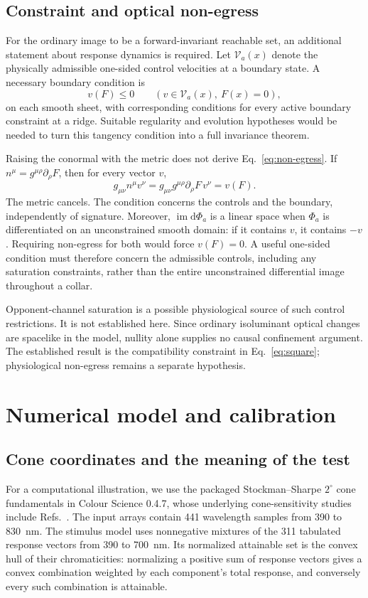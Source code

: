 \documentclass[11pt,letterpaper]{article}
\theoremstyle{plain}
\newcommand{\dd}{\mathrm{d}}
\begin{document}
\subsection{Constraint and optical non-egress}
For the ordinary image to be a forward-invariant reachable set, an additional statement about response dynamics is required. Let $\mathcal V_a(x)$ denote the physically admissible one-sided control velocities at a boundary state. A necessary boundary condition is
\begin{equation}
 v(F)\leq0\qquad(v\in\mathcal V_a(x),\ F(x)=0),
 \label{eq:non-egress}
\end{equation}
on each smooth sheet, with corresponding conditions for every active boundary constraint at a ridge. Suitable regularity and evolution hypotheses would be needed to turn this tangency condition into a full invariance theorem.

Raising the conormal with the metric does not derive Eq.~\eqref{eq:non-egress}. If $n^\mu=g^{\mu\rho}\partial_\rho F$, then for every vector $v$,
\begin{equation}
 g_{\mu\nu}n^\mu v^\nu
 =g_{\mu\nu}g^{\mu\rho}\partial_\rho F\,v^\nu
 =v(F).
 \label{eq:identity}
\end{equation}
The metric cancels. The condition concerns the controls and the boundary, independently of signature. Moreover, $\operatorname{im}\dd\Phi_a$ is a linear space when $\Phi_a$ is differentiated on an unconstrained smooth domain: if it contains $v$, it contains $-v$. Requiring non-egress for both would force $v(F)=0$. A useful one-sided condition must therefore concern the admissible controls, including any saturation constraints, rather than the entire unconstrained differential image throughout a collar.

Opponent-channel saturation is a possible physiological source of such control restrictions. It is not established here. Since ordinary isoluminant optical changes are spacelike in the model, nullity alone supplies no causal confinement argument. The established result is the compatibility constraint in Eq.~\eqref{eq:square}; physiological non-egress remains a separate hypothesis.

\section{Numerical model and calibration}
\label{sec:numerics}
\subsection{Cone coordinates and the meaning of the test}
\label{sec:identification}
For a computational illustration, we use the packaged Stockman--Sharpe $2^\circ$ cone fundamentals in Colour Science 0.4.7, whose underlying cone-sensitivity studies include Refs.~\cite{Stockman2000,Stockman1999}. The input arrays contain 441 wavelength samples from 390 to 830~nm. The stimulus model uses nonnegative mixtures of the 311 tabulated response vectors from 390 to 700~nm. Its normalized attainable set is the convex hull of their chromaticities: normalizing a positive sum of response vectors gives a convex combination weighted by each component's total response, and conversely every such combination is attainable.
\end{document}
